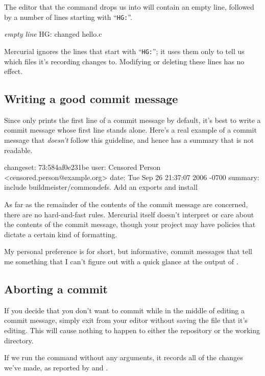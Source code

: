 The editor that the  command drops us into will contain
an empty line, followed by a number of lines starting with
``\texttt{HG:}''.
\begin{codesample2}
  \emph{empty line}
  HG: changed hello.c
\end{codesample2}
Mercurial ignores the lines that start with ``\texttt{HG:}''; it uses
them only to tell us which files it's recording changes to.  Modifying
or deleting these lines has no effect.

\subsection{Writing a good commit message}

Since  only prints the first line of a commit message by
default, it's best to write a commit message whose first line stands
alone.  Here's a real example of a commit message that \emph{doesn't}
follow this guideline, and hence has a summary that is not readable.
\begin{codesample2}
  changeset:   73:584af0e231be
  user:        Censored Person <censored.person@example.org>
  date:        Tue Sep 26 21:37:07 2006 -0700
  summary:     include buildmeister/commondefs.   Add an exports and install
\end{codesample2}

As far as the remainder of the contents of the commit message are
concerned, there are no hard-and-fast rules.  Mercurial itself doesn't
interpret or care about the contents of the commit message, though
your project may have policies that dictate a certain kind of
formatting.

My personal preference is for short, but informative, commit messages
that tell me something that I can't figure out with a quick glance at
the output of .

\subsection{Aborting a commit}

If you decide that you don't want to commit while in the middle of
editing a commit message, simply exit from your editor without saving
the file that it's editing.  This will cause nothing to happen to
either the repository or the working directory.

If we run the  command without any arguments, it records
all of the changes we've made, as reported by  and
.

